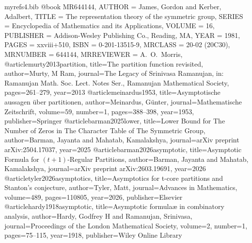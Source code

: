 \documentclass[11pt]{amsart}
\theoremstyle{plain}
\numberwithin{equation}{section}
\begin{document}
	\begin{filecontents}{myrefs4.bib}
		@book {MR644144,
			AUTHOR = {James, Gordon and Kerber, Adalbert},
			TITLE = {The representation theory of the symmetric group},
			SERIES = {Encyclopedia of Mathematics and its Applications},
			VOLUME = {16},
			PUBLISHER = {Addison-Wesley Publishing Co., Reading, MA},
			YEAR = {1981},
			PAGES = {xxviii+510},
			ISBN = {0-201-13515-9},
			MRCLASS = {20-02 (20C30)},
			MRNUMBER = {644144},
			MRREVIEWER = {A.\ O.\ Morris},
		}
		@article{murty2013partition,
			title={The partition function revisited},
			author={Murty, M Ram},
			journal={The Legacy of Srinivasa Ramanujan, in: Ramanujan Math. Soc. Lect. Notes Ser., Ramanujan Mathematical Society},
			pages={261--279},
			year={2013}
		}
		@article{meinardus1953,
			title={Asymptotische aussagen {\"u}ber partitionen},
			author={Meinardus, G{\"u}nter},
			journal={Mathematische Zeitschrift},
			volume={59},
			number={1},
			pages={388--398},
			year={1953},
			publisher={Springer}
		}
		@article{barman2025lower,
			title={Lower Bound for The Number of Zeros in The Character Table of The Symmetric Group},
			author={Barman, Jayanta and Mahatab, Kamalakshya},
			journal={arXiv preprint arXiv:2504.17037},
			year={2025}
		}
		@article{barman2026asymptotic,
			title={Asymptotic Formula for $(t+ 1) $-Regular Partitions},
			author={Barman, Jayanta and Mahatab, Kamalakshya},
			journal={arXiv preprint arXiv:2603.19691},
			year={2026}
		}
		@article{tyler2026asymptotics,
			title={Asymptotics for t-core partitions and {S}tanton's conjecture},
			author={Tyler, Matt},
			journal={Advances in Mathematics},
			volume={489},
			pages={110805},
			year={2026},
			publisher={Elsevier}
		}
		@article{hardy1918asymptotic,
			title={Asymptotic formula{\ae} in combinatory analysis},
			author={Hardy, Godfrey H and Ramanujan, Srinivasa},
			journal={Proceedings of the London Mathematical Society},
			volume={2},
			number={1},
			pages={75--115},
			year={1918},
			publisher={Wiley Online Library}
		}
		

\end{filecontents}
\end{document}
